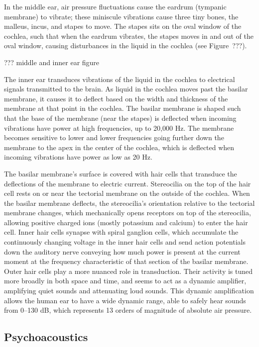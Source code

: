 In the middle ear,
air pressure fluctuations
cause the eardrum (tympanic membrane)
to vibrate;
these miniscule vibrations
cause three tiny bones,
the malleus, incus, and stapes to move.
The stapes sits on the oval window
of the cochlea,
such that when the eardrum vibrates,
the stapes moves in and out of the oval window,
causing disturbances in the liquid
in the cochlea
(see Figure~???).

??? middle and inner ear figure

The inner ear transduces vibrations
of the liquid in the cochlea
to electrical signals transmitted
to the brain.
As liquid in the cochlea
moves past the basilar membrane,
it causes it to deflect
based on the width and thickness
of the membrane at that point
in the cochlea.
The basilar membrane
is shaped such that
the base of the membrane
(near the stapes)
is deflected when
incoming vibrations have power
at high frequencies,
up to 20,000 Hz.
The membrane becomes sensitive
to lower and lower frequencies
going further down the membrane
to the apex
in the center of the cochlea,
which is deflected when incoming vibrations
have power as low as 20 Hz.

The basilar membrane's surface is covered
with hair cells that transduce
the deflections of the membrane
to electric current.
Stereocilia on the top of the hair cell
rests on or near the tectorial membrane
on the outside of the cochlea.
When the basilar membrane deflects,
the stereocilia's orientation
relative to the tectorial membrane changes,
which mechanically opens receptors
on top of the stereocilia,
allowing positive charged ions
(mostly potassium and calcium)
to enter the hair cell.
Inner hair cells synapse with
spiral ganglion cells,
which accumulate the continuously
changing voltage in the inner hair cells
and send action potentials
down the auditory nerve
conveying how much power
is present at the current moment
at the frequency characteristic
of that section of the basilar membrane.
Outer hair cells play a more nuanced
role in transduction.
Their activity is tuned
more broadly in both space and time,
and seems to act as a dynamic amplifier,
amplifying quiet sounds and
attenuating loud sounds.
This dynamic amplification allows
the human ear to have a wide dynamic range,
able to safely hear sounds from 0--130 dB,
which represents 13 orders of magnitude
of absolute air pressure.

\subsection{Psychoacoustics}

